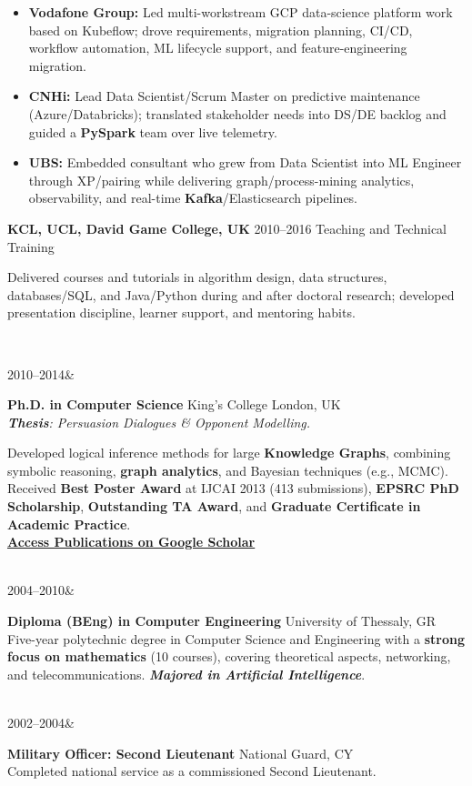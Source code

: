 \documentclass[]{../../../../friggeri-cv}
\renewcommand{\entry}[4]{%
  \parbox[t]{\dimexpr\textwidth-\entryleftinset\relax}{%
    \textbf{#2}%
    {\footnotesize\addfontfeature{Color=lightgray}\hspace{0.6em}#1}%
    \hfill%
    {\small\color{textcolor} #3}\\%
    #4\vspace{\parsep}%
  }\\}
\renewcommand{\entrytwo}[4]{%
  #1&\parbox[t]{14cm}{%
    \textbf{#2}%
    \hfill%
    {\small\color{textcolor} #3}\\%
    #4\vspace{\parsep}%
  }\\}
\begin{document}
\begin{entrylist}
{{        }
        \begin{itemize}[leftmargin=1.1em]
            \item \footnotesize\textbf{Vodafone Group:} Led multi-workstream GCP data-science platform work based on Kubeflow; drove requirements, migration planning, CI/CD, workflow automation, ML lifecycle support, and feature-engineering migration.
            \item \footnotesize\textbf{CNHi:} Lead Data Scientist/Scrum Master on predictive maintenance (Azure/Databricks); translated stakeholder needs into DS/DE backlog and guided a \textbf{PySpark} team over live telemetry.
            \item \footnotesize\textbf{UBS:} Embedded consultant who grew from Data Scientist into ML Engineer through XP/pairing while delivering graph/process-mining analytics, observability, and real-time \textbf{Kafka}/Elasticsearch pipelines.
        \end{itemize}
    }
    \entry
    {2010--2016}
    {KCL, UCL, David Game College, UK}
    {Teaching and Technical Training}
    {
        {\small
        \setlength{\parindent}{0pt}
        \setlength{\leftskip}{0pt}
        Delivered courses and tutorials in algorithm design, data structures, databases/SQL, and Java/Python during and after doctoral research; developed presentation discipline, learner support, and mentoring habits.

        }
    }
\end{entrylist}
\newpage
\setlength{\parskip}{2pt}
\setlength{\parsep}{0pt}
\begin{entrylist2}
    \entrytwo
        {\small 2010--2014}
        {\small Ph.D. in Computer Science}
        {\small King's College London, UK}
        {\small \emph{\textbf{Thesis}: Persuasion Dialogues \& Opponent Modelling.}

        {\footnotesize Developed logical inference methods for large \textbf{Knowledge Graphs}, combining symbolic reasoning, \textbf{graph analytics}, and Bayesian techniques (e.g., MCMC). Received \textbf{Best Poster Award} at IJCAI 2013 (413 submissions), \textbf{EPSRC PhD Scholarship}, \textbf{Outstanding TA Award}, and \textbf{Graduate Certificate in Academic Practice}.
        \\ \textbf{\textcolor{blue}{\href{https://scholar.google.com/citations?hl=en&user=Rr3KTx8AAAAJ}{\underline{Access Publications on Google Scholar}}}}}
        }
    \entrytwo
        {\small  2004--2010}
        {\small Diploma (BEng) in Computer Engineering}
        {\small University of Thessaly, GR}
        {\footnotesize Five-year polytechnic degree in Computer Science and Engineering with a \textbf{strong focus on mathematics} (10 courses), covering theoretical aspects, networking, and telecommunications. \emph{\textbf{Majored in Artificial Intelligence}}.}
    \entrytwo
        {\small  2002--2004}
        {\small Military Officer: Second Lieutenant}
        {\small National Guard, CY}
        {\small Completed national service as a commissioned Second Lieutenant.}
\end{entrylist2}
\end{document}
